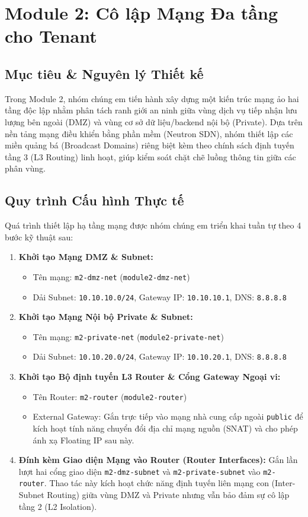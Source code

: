 \section{Module 2: Cô lập Mạng Đa tầng cho Tenant}

\subsection{Mục tiêu \& Nguyên lý Thiết kế}
Trong Module 2, nhóm chúng em tiến hành xây dựng một kiến trúc mạng ảo hai tầng độc lập nhằm phân tách ranh giới an ninh giữa vùng dịch vụ tiếp nhận lưu lượng bên ngoài (DMZ) và vùng cơ sở dữ liệu/backend nội bộ (Private). Dựa trên nền tảng mạng điều khiển bằng phần mềm (Neutron SDN), nhóm thiết lập các miền quảng bá (Broadcast Domains) riêng biệt kèm theo chính sách định tuyến tầng 3 (L3 Routing) linh hoạt, giúp kiểm soát chặt chẽ luồng thông tin giữa các phân vùng.

\subsection{Quy trình Cấu hình Thực tế}
Quá trình thiết lập hạ tầng mạng được nhóm chúng em triển khai tuần tự theo 4 bước kỹ thuật sau:

\begin{enumerate}
    \item \textbf{Khởi tạo Mạng DMZ \& Subnet:}
    \begin{itemize}
        \item Tên mạng: \texttt{m2-dmz-net} (\texttt{module2-dmz-net})
        \item Dải Subnet: \texttt{10.10.10.0/24}, Gateway IP: \texttt{10.10.10.1}, DNS: \texttt{8.8.8.8}
    \end{itemize}
    \item \textbf{Khởi tạo Mạng Nội bộ Private \& Subnet:}
    \begin{itemize}
        \item Tên mạng: \texttt{m2-private-net} (\texttt{module2-private-net})
        \item Dải Subnet: \texttt{10.10.20.0/24}, Gateway IP: \texttt{10.10.20.1}, DNS: \texttt{8.8.8.8}
    \end{itemize}
    \item \textbf{Khởi tạo Bộ định tuyến L3 Router \& Cổng Gateway Ngoại vi:}
    \begin{itemize}
        \item Tên Router: \texttt{m2-router} (\texttt{module2-router})
        \item External Gateway: Gắn trực tiếp vào mạng nhà cung cấp ngoài \texttt{public} để kích hoạt tính năng chuyển đổi địa chỉ mạng nguồn (SNAT) và cho phép ánh xạ Floating IP sau này.
    \end{itemize}
    \item \textbf{Đính kèm Giao diện Mạng vào Router (Router Interfaces):}
    Gắn lần lượt hai cổng giao diện \texttt{m2-dmz-subnet} và \texttt{m2-private-subnet} vào \texttt{m2-router}. Thao tác này kích hoạt chức năng định tuyến liên mạng con (Inter-Subnet Routing) giữa vùng DMZ và Private nhưng vẫn bảo đảm sự cô lập tầng 2 (L2 Isolation).
\end{enumerate}

